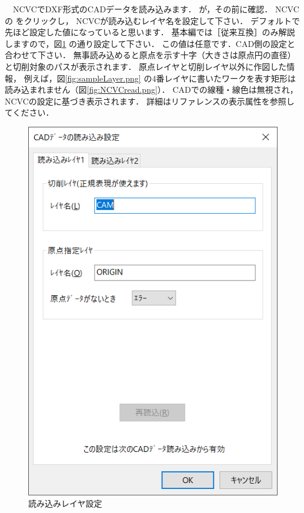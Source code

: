 \begin{minipage}[t]{0.5\textwidth}
　NCVCでDXF形式のCADデータを読み込みます．
が，その前に確認．
NCVCの  をクリックし，
NCVCが読み込むレイヤ名を設定して下さい．
デフォルトで先ほど設定した値になっていると思います．
基本編では［従来互換］のみ解説しますので，図\ref{fig:NCVCsetup.png} の通り設定して下さい．
この値は任意です．CAD側の設定と合わせて下さい．
無事読み込めると原点を示す十字（大きさは原点円の直径）と切削対象のパスが表示されます．
原点レイヤと切削レイヤ以外に作図した情報，
例えば，図\ref{fig:sampleLayer.png} の4番レイヤに書いたワークを表す矩形は読み込まれません（図\ref{fig:NCVCread.png}）．
CADでの線種・線色は無視され，NCVCの設定に基づき表示されます．
詳細はリファレンスの表示属性を参照してください．
\end{minipage}
\begin{minipage}[t]{0.5\textwidth}
\vspace*{-2zh}
\begin{figure}[H]
\centering
\includegraphics[scale=0.8]{No2/fig/NCVCsetup.png}
\caption{読み込みレイヤ設定}
\label{fig:NCVCsetup.png}
\end{figure}
\end{minipage}

